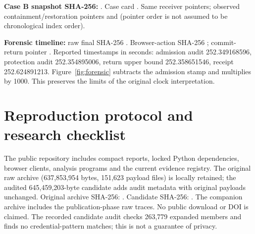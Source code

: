 \documentclass[10pt]{article}
\begin{document}
\textbf{Case B snapshot SHA-256:} . Case card . Same receiver pointers; observed containment/restoration pointers  and  (pointer order is not assumed to be chronological index order).

\textbf{Forensic timeline:} raw final SHA-256 . Browser-action SHA-256 ; commit-return pointer . Reported timestamps in seconds: admission audit 252.349168596, protection audit 252.354895006, return upper bound 252.358651546, receipt 252.624891213. Figure~\ref{fig:forensic} subtracts the admission stamp and multiplies by 1000. This preserves the limits of the original clock interpretation.
\section{Reproduction protocol and research checklist}
The public repository includes compact reports, locked Python dependencies, browser clients, analysis programs and the current evidence registry. The original raw archive (637,853,954 bytes, 151,623 payload files) is locally retained; the audited 645,459,203-byte candidate adds audit metadata with original payloads unchanged. Original archive SHA-256: . Candidate SHA-256: . The companion archive includes the publication-phase raw traces. No public download or DOI is claimed. The recorded candidate audit checks 263,779 expanded members and finds no credential-pattern matches; this is not a guarantee of privacy.
\end{document}
